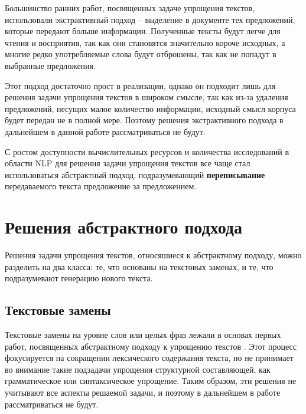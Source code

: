 Большинство ранних работ, посвященных задаче упрощения текстов, использовали экстрактивный подход -- выделение в документе тех предложений, которые передают больше информации. Полученные тексты будут легче для чтения и восприятия, так как они становятся значительно короче исходных, а многие редко употребляемые слова будут отброшены, так как не попадут в выбранные предложения. 

Этот подход достаточно прост в реализации, однако он подходит лишь для решения задачи упрощения текстов в широком смысле, так как из-за удаления предложений, несущих малое количество информации, исходный смысл корпуса будет передан не в полной мере. Поэтому решения экстрактивного подхода в дальнейшем в данной работе рассматриваться не будут.

С ростом доступности вычислительных ресурсов и количества исследований в области NLP для решения задачи упрощения текстов все чаще стал использоваться абстрактный подход, подразумевающий \textbf{переписывание} передаваемого текста предложение за предложением\cite{see_get_2017}. 

\section{Решения абстрактного подхода}

Решения задачи упрощения текстов, относяшиеся к абстрактному подходу, можно разделить на два класса: те, что основаны на текстовых заменах, и те, что подразумевают генерацию нового текста.

\subsection{Текстовые замены}

Текстовые замены на уровне слов или целых фраз лежали в основах первых работ, посвященных абстрактному подходу к упрощению текстов \cite{paetzold_survey_2017}. Этот процесс фокусируется на сокращении лексического содержания текста, но не принимает во внимание такие подзадачи упрощения структурной составляющей, как грамматическое или синтаксическое упрощение\cite{shardlow_survey_2014}. Таким образом, эти решения не учитывают все аспекты решаемой задачи, и поэтому в дальнейшем в работе рассматриваться не будут.

